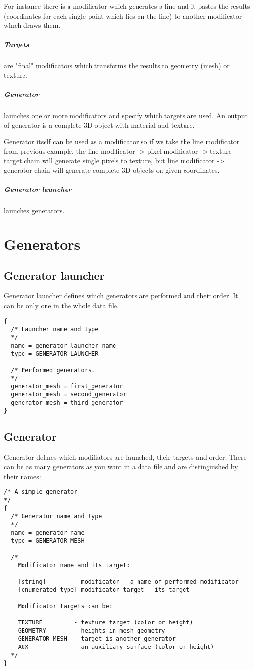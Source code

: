 \documentclass[9pt]{article}
\begin{document}
For instance there is a modificator which generates a line and it 
pastes the results (coordinates for each single point which lies on the line) 
to another modificator which draws them.

\subparagraph{Targets}
are "final" modificators which transforms the results to geometry (mesh) or texture. 

\subparagraph{Generator}
launches one or more modificators and specify which targets are used.  
An output of generator is a complete 3D object with material and texture. 

Generator itself can be used as a modificator so
if we take the line modificator from previous example, 
the line modificator -> pixel modificator -> texture target chain will 
generate single pixels to texture, but line modificator -> generator 
chain will generate complete 3D objects on given coordinates.

\subparagraph{Generator launcher}
launches generators.

\section{Generators}

\subsection{Generator launcher}

Generator launcher defines which generators are performed and their order. 
It can be only one in the whole data file.

\begin{verbatim}
{
  /* Launcher name and type
  */
  name = generator_launcher_name
  type = GENERATOR_LAUNCHER

  /* Performed generators. 
  */
  generator_mesh = first_generator
  generator_mesh = second_generator
  generator_mesh = third_generator
}
\end{verbatim}

\subsection{Generator}

Generator defines which modifiators are launched, their targets and order. 
There can be as many generators as you want in a data file and 
are distinguished by their names:

\begin{verbatim}
/* A simple generator
*/
{
  /* Generator name and type
  */
  name = generator_name
  type = GENERATOR_MESH

  /*
    Modificator name and its target:
    
    [string]          modificator - a name of performed modificator
    [enumerated type] modificator_target - its target
    
    Modificator targets can be:
    
    TEXTURE         - texture target (color or height)
    GEOMETRY        - heights in mesh geometry
    GENERATOR_MESH  - target is another generator
    AUX             - an auxiliary surface (color or height)
  */
}
\end{verbatim}
\end{document}
